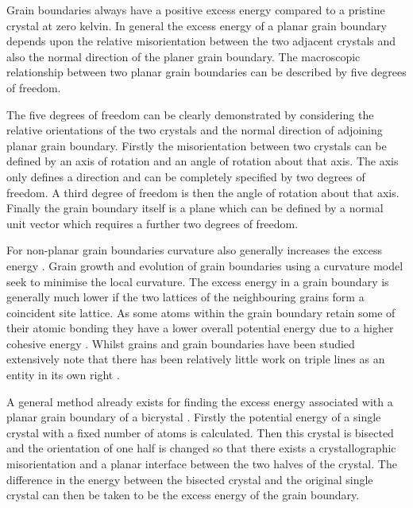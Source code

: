 \documentclass[12pt,a4paper,openany]{report}
\begin{document}
Grain boundaries always have a positive excess energy compared to a pristine crystal at zero kelvin. In general the excess energy of a planar grain boundary depends upon the relative misorientation between the two adjacent crystals and also the normal direction of the planer grain boundary. The macroscopic relationship between two planar grain boundaries can be described by five degrees of freedom. 

The five degrees of freedom can be clearly demonstrated by considering the relative orientations of the two crystals and the normal direction of adjoining planar grain boundary. Firstly the misorientation between two crystals can be defined by an axis of rotation and an angle of rotation about that axis.  The axis only defines a direction and can be completely specified by two degrees of freedom. A third degree of freedom is then the angle of rotation about that axis. Finally the grain boundary itself is a plane which can be defined by a normal unit vector which requires a further two degrees of freedom.

For non-planar grain boundaries curvature also generally increases the excess energy \cite{Mason2015}. Grain growth and evolution of grain boundaries using a curvature model seek to minimise the local curvature.  The excess energy in a grain boundary is generally much lower if the two lattices of the neighbouring grains form a coincident site lattice. As some atoms within the grain boundary retain some of their atomic bonding they have a lower overall potential energy due to a higher cohesive energy \cite{Rohrer2011}. Whilst grains and grain boundaries have been studied extensively \citeauthor{Chaix:149279} note that there has been relatively little work on triple lines as an entity in its own right \cite{Chaix:149279}.

A general method already exists for finding the excess energy associated with a planar grain boundary of a bicrystal \cite{Han2018}. Firstly the potential energy of a single crystal with a fixed number of atoms is calculated. Then this crystal is bisected and the orientation of one half is changed so that there exists a crystallographic misorientation and a planar interface between the two halves of the crystal. The difference in the energy between the bisected crystal and the original single crystal can then be taken to be the excess energy of the grain boundary.
\end{document}
